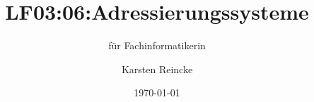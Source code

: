 \documentclass[]{beamer}
\title{LF03:06:Adressierungssysteme}
\subtitle{für Fachinformatikerin}
\institute[GS-LDK]{Gewerbliche Schulen Dillenburg}
\author{Karsten Reincke}
\date{\today}
\def\cfgGl{../../../cfg.gl/}
\begin{document}

\begin{frame}
  \titlepage

  
\end{frame}






\logo{}
\newpage



%
\end{document}
